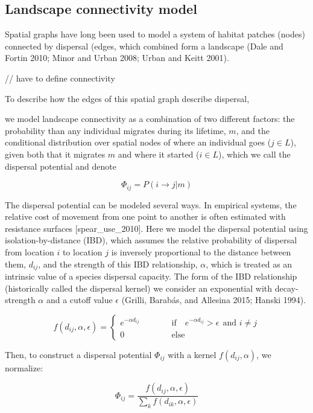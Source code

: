 \documentclass[11pt]{article}
\begin{document}
\hypertarget{landscape-connectivity-model}{%
\subsection{Landscape connectivity
model}\label{landscape-connectivity-model}}

Spatial graphs have long been used to model a system of habitat patches
(nodes) connected by dispersal (edges, which combined form a landscape
(Dale and Fortin 2010; Minor and Urban 2008; Urban and Keitt 2001).

// have to define connectivity

To describe how the edges of this spatial graph describe dispersal,

we model landscape connectivity as a combination of two different
factors: the probability than any individual migrates during its
lifetime, \(m\), and the conditional distribution over spatial nodes of
where an individual goes (\(j \in L\)), given both that it migrates
\(m\) and where it started (\(i \in L\)), which we call the dispersal
potential and denote

\[\Phi_{ij} =  P(i \to j | m)\]

The dispersal potential can be modeled several ways. In empirical
systems, the relative cost of movement from one point to another is
often estimated with resistance surfaces {[}spear\_use\_2010{]}. Here we
model the dispersal potential using isolation-by-distance (IBD), which
assumes the relative probability of dispersal from location \(i\) to
location \(j\) is inversely proportional to the distance between them,
\(d_{ij}\), and the strength of this IBD relationship, \(\alpha\), which
is treated as an intrinsic value of a species dispersal capacity. The
form of the IBD relationship (historically called the dispersal kernel)
we consider an exponential with decay-strength \(\alpha\) and a cutoff
value \(\epsilon\) (Grilli, Barabás, and Allesina 2015; Hanski 1994).

\[f(d_{ij}, \alpha, \epsilon) =  \begin{cases} e^{-\alpha d_{ij}}
\quad\quad\quad &\text{if}\quad e^{-\alpha d_{ij}} > \epsilon \ \ \text{and } i
\neq j \\   0 &\text{else} \end{cases}\]

Then, to construct a dispersal potential \(\Phi_{ij}\) with a kernel
\(f(d_{ij}, \alpha)\), we normalize:

\[\Phi_{ij} = \frac{f(d_{ij}, \alpha, \epsilon)}{\sum_k f(d_{ik},\alpha,
\epsilon)}\]
\end{document}
